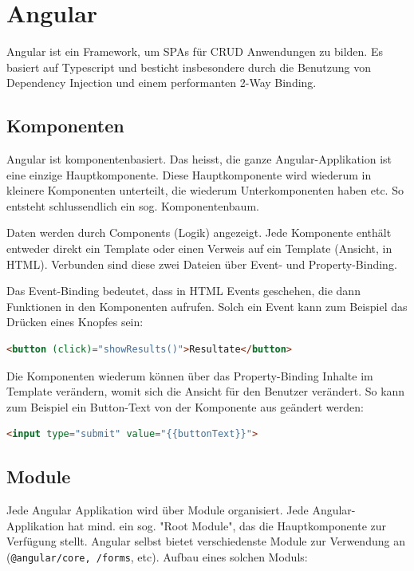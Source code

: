 \documentclass[a4paper, 11pt]{article}
\newcommand{\code}[1]{\texttt{#1}}
\begin{document}
\newpage

\section{Angular}
Angular ist ein Framework, um SPAs für CRUD Anwendungen zu bilden. Es basiert auf Typescript und besticht insbesondere durch die Benutzung von Dependency Injection und einem performanten 2-Way Binding.

\subsection{Komponenten}
Angular ist komponentenbasiert. Das heisst, die ganze Angular-Applikation ist eine einzige Hauptkomponente. Diese Hauptkomponente wird wiederum in kleinere Komponenten unterteilt, die wiederum Unterkomponenten haben etc. So entsteht schlussendlich ein sog. Komponentenbaum.

Daten werden durch Components (Logik) angezeigt. Jede Komponente enthält entweder direkt ein Template oder einen Verweis auf ein Template (Ansicht, in HTML). Verbunden sind diese zwei Dateien über Event- und Property-Binding. 

Das Event-Binding bedeutet, dass in HTML Events geschehen, die dann Funktionen in den Komponenten aufrufen. Solch ein Event kann zum Beispiel das Drücken eines Knopfes sein:

\begin{lstlisting}[language=html]
<button (click)="showResults()">Resultate</button>
\end{lstlisting}

Die Komponenten wiederum können über das Property-Binding Inhalte im Template verändern, womit sich die Ansicht für den Benutzer verändert. So kann zum Beispiel ein Button-Text von der Komponente aus geändert werden:

\begin{lstlisting}[language=html]
<input type="submit" value="{{buttonText}}">
\end{lstlisting}

\newpage

\subsection{Module}
Jede Angular Applikation wird über Module organisiert. Jede Angular-Applikation hat mind. ein sog. "Root Module", das die Hauptkomponente zur Verfügung stellt. Angular selbst bietet verschiedenste Module zur Verwendung an (\code{@angular/core, /forms}, etc). Aufbau eines solchen Moduls:
\end{document}
